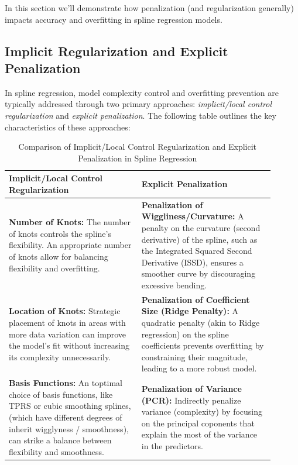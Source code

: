 \documentclass[12pt, twoside,hidelinks]{article}
\theoremstyle{definition}
\numberwithin{equation}{section}
\begin{document}
In this section we'll demonstrate how penalization (and regularization generally) impacts accuracy and overfitting in spline regression models. 

\subsection{Implicit Regularization and Explicit Penalization}

In spline regression, model complexity control and overfitting prevention are typically addressed through two primary approaches: \textit{implicit/local control regularization} and \textit{explicit penalization}. The following table outlines the key characteristics of these approaches:

\begin{table}[H]
\centering
\begin{tabular}{|p{0.45\linewidth}|p{0.45\linewidth}|}
\hline
\textbf{Implicit/Local Control Regularization} & \textbf{Explicit Penalization} \\ \hline
\textbf{Number of Knots:} The number of knots controls the spline's flexibility. An appropriate number of knots allow for balancing flexibility and overfitting. & \textbf{Penalization of Wiggliness/Curvature:} A penalty on the curvature (second derivative) of the spline, such as the Integrated Squared Second Derivative (ISSD), ensures a smoother curve by discouraging excessive bending. \\ \hline
\textbf{Location of Knots:} Strategic placement of knots in areas with more data variation can improve the model's fit without increasing its complexity unnecessarily. & \textbf{Penalization of Coefficient Size (Ridge Penalty):} A quadratic penalty (akin to Ridge regression) on the spline coefficients prevents overfitting by constraining their magnitude, leading to a more robust model. \\ \hline
\textbf{Basis Functions:} An toptimal choice of basis functions, like TPRS or cubic smoothing splines, (which have different degrees of inherit wigglyness / smoothness), can strike a balance between flexibility and smoothness. &  \textbf{Penalization of Variance (PCR):} Indirectly penalize variance (complexity) by focusing on the principal coponents that explain the most of the variance in the predictors. \\ \hline
\end{tabular}
\caption{Comparison of Implicit/Local Control Regularization and Explicit Penalization in Spline Regression}
\label{tab:regularization_penalization}
\end{table}
\end{document}
